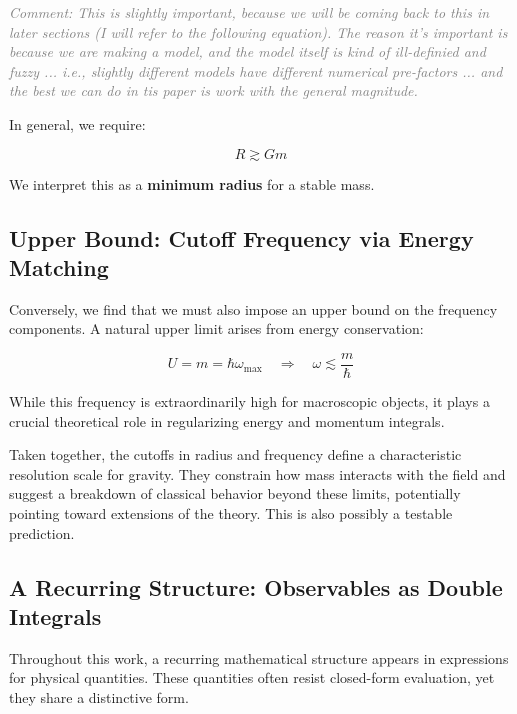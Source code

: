 \documentclass {article}
\newcommand{\comment}[1]{\textcolor{gray}{\small\textit{Comment: #1}}}
\begin{document}
\comment{This is slightly important, because we will be coming back to this in later sections (I will refer to the following equation). The reason it's important is because we are making a model, and the model itself is kind of  ill-definied and fuzzy ... i.e., slightly  different models have different numerical pre-factors ... and the best we can do in tis paper is work with the general magnitude.}

In general, we require:

\begin{equation}
R \gtrsim G m
\end{equation}
\label{radius}

We interpret this as a \textbf{minimum radius} for a stable mass. 

\subsection{Upper Bound: Cutoff Frequency via Energy Matching}

Conversely, we find that we must also impose an upper bound on the frequency components.  A natural upper limit arises from energy conservation:


\begin{equation}
U = m = \hbar \omega_{\text{max}} \quad \Rightarrow \quad \omega \lesssim \frac{m}{\hbar}
\end{equation}


While this frequency is extraordinarily high for macroscopic objects, it plays a crucial theoretical role in regularizing energy and momentum integrals. 

\vspace{0.5em}
Taken together, the cutoffs in radius and frequency define a characteristic resolution scale for gravity. They constrain how mass interacts with the field and suggest a breakdown of classical behavior beyond these limits, potentially pointing toward extensions of the theory. This is also possibly a testable prediction.

\subsection{A Recurring Structure: Observables as Double Integrals}
\label{subsec:heuristic}

Throughout this work, a recurring mathematical structure appears in expressions for physical quantities. These quantities often resist closed-form evaluation, yet they share a distinctive form.
\end{document}
